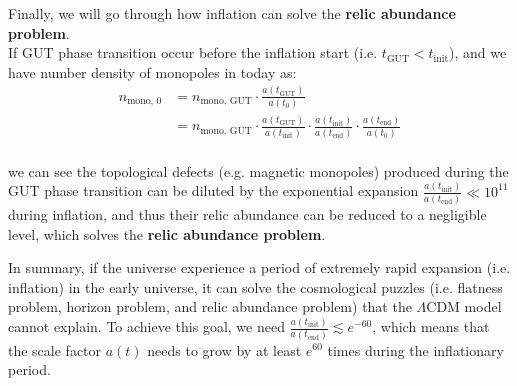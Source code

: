 \bigskip \noindent
\begin{foundation}
    Finally, we will go through how inflation can solve the \textbf{relic abundance problem}. \\

    If GUT phase transition occur before the inflation start (i.e. $t_{\text{GUT}} < t_{\text{init}}$), and we have number density of monopoles in today as:
    \begin{align*}
        n_{\text{mono, 0}} &= n_{\text{mono, GUT}} \cdot \frac{a(t_{\text{GUT}})}{a(t_{0})} \\
        &= n_{\text{mono, GUT}} \cdot \frac{a(t_{\text{GUT}})}{a(t_{\text{init}})} \cdot \frac{a(t_{\text{init}})}{a(t_{\text{end}})} \cdot \frac{a(t_{\text{end}})}{a(t_{0})} \\
    \end{align*}
    
    we can see the topological defects (e.g. magnetic monopoles) produced during the GUT phase transition can be diluted by the exponential expansion $\frac{a(t_{\text{init}})}{a(t_{\text{end}})} \ll 10^{11}$ during inflation, and thus their relic abundance can be reduced to a negligible level, which solves the \textbf{relic abundance problem}.
\end{foundation}

\bigskip \noindent
\begin{remark}
    In summary, if the universe experience a period of extremely rapid expansion (i.e. inflation) in the early universe, it can solve the cosmological puzzles (i.e. flatness problem, horizon problem, and relic abundance problem) that the $\Lambda$CDM model cannot explain. To achieve this goal, we need $\frac{a(t_{\text{init}})}{a(t_{\text{end}})} \lesssim e^{-60}$, which means that the scale factor $a(t)$ needs to grow by at least $e^{60}$ times during the inflationary period.
\end{remark}

\bigskip \noindent \bigskip \noindent \bigskip \noindent
